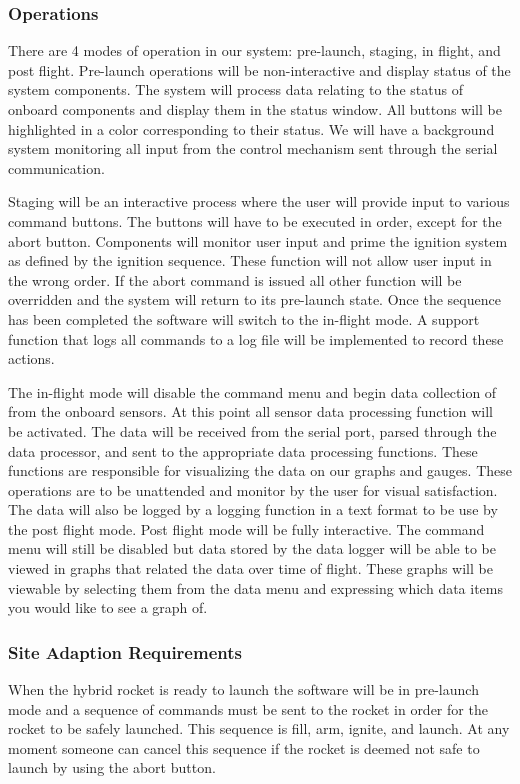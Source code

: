 \documentclass[10pt,draftclsnofoot,onecolumn,compsoc]{IEEEtran}
\begin{document}
\subsubsection {Operations}
There are 4 modes of operation in our system: pre-launch, staging, in flight, and post flight.  Pre-launch operations will be non-interactive and display status of the system components. The system will process data relating to the status of onboard components and display them in the status window. All buttons will be highlighted in a color corresponding to their status. We will have a background system monitoring all input from the control mechanism sent through the serial communication. \par
	Staging will be an interactive process where the user will provide input to various command buttons. The buttons will have to be executed in order, except for the abort button. Components will monitor user input and prime the ignition system as defined by the ignition sequence. These function will not allow user input in the wrong order. If the abort command is issued all other function will be overridden and the system will return to its pre-launch state. Once the sequence has been completed the software will switch to the in-flight mode. A support function that logs all commands to a log file will be implemented to record these actions.\par
	The in-flight mode will disable the command menu and begin data collection of from the onboard sensors. At this point all sensor data processing function will be activated. The data will be received from the serial port, parsed through the data processor, and sent to the appropriate data processing functions. These functions are responsible for visualizing the data on our graphs and gauges. These operations are to be unattended and monitor by the user for visual satisfaction.  The data will also be logged by a logging function in a text format to be use by the post flight mode.
	Post flight mode will be fully interactive. The command menu will still be disabled but data stored by the data logger will be able to be viewed in graphs that related the data over time of flight. These graphs will be viewable by selecting them from the data menu and expressing which data items you would like to see a graph of. \par

\subsubsection{Site Adaption Requirements}
When the hybrid rocket is ready to launch the software will be in pre-launch mode and a sequence of commands must be sent to the rocket in order for the rocket to be safely launched. This sequence is fill, arm, ignite, and launch. At any moment someone can cancel this sequence if the rocket is deemed not safe to launch by using the abort button.
\end{document}
